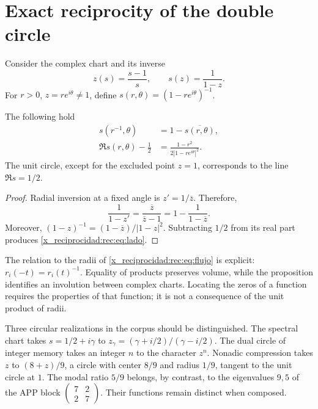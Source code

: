 \section{Exact reciprocity of the double circle}
\label{x_reciprocidad:rec:doble-circulo}

Consider the complex chart and its inverse
\[
 z(s)=\frac{s-1}{s},\qquad s(z)=\frac1{1-z}.
\]
For \(r>0\), \(z=re^{i\theta}\ne1\), define \(s(r,\theta)=(1-re^{i\theta})^{-1}\).

\begin{proposition}
\label{x_reciprocidad:rec:prop:espejo}
The following hold
\begin{align}
 s(r^{-1},\theta)&=1-\overline{s(r,\theta)},\label{x_reciprocidad:rec:eq:espejo}\\
 \Re s(r,\theta)-\frac12&=
 \frac{1-r^2}{2|1-re^{i\theta}|^2}.\label{x_reciprocidad:rec:eq:lado}
\end{align}
The unit circle, except for the excluded point \(z=1\), corresponds to the line \(\Re s=1/2\).
\end{proposition}
\begin{proof}
Radial inversion at a fixed angle is \(z'=1/\overline z\). Therefore,
\[
 \frac1{1-z'}=\frac{\overline z}{\overline z-1}
 =1-\frac1{1-\overline z}.
\]
Moreover, \((1-z)^{-1}=(1-\overline z)/|1-z|^2\). Subtracting \(1/2\) from its real part produces \eqref{x_reciprocidad:rec:eq:lado}.
\end{proof}

The relation to the radii of \eqref{x_reciprocidad:rec:eq:flujo} is explicit: \(r_i(-t)=r_i(t)^{-1}\). Equality of products preserves volume, while the proposition identifies an involution between complex charts. Locating the zeros of a function requires the properties of that function; it is not a consequence of the unit product of radii.

Three circular realizations in the corpus should be distinguished. The spectral chart takes \(s=1/2+i\gamma\) to \(z_\gamma=(\gamma+i/2)/(\gamma-i/2)\). The dual circle of integer memory takes an integer \(n\) to the character \(z^n\). Nonadic compression takes \(z\) to \((8+z)/9\), a circle with center \(8/9\) and radius \(1/9\), tangent to the unit circle at \(1\). The modal ratio \(5/9\) belongs, by contrast, to the eigenvalues \(9,5\) of the APP block \(\left(\begin{smallmatrix}7&2\\2&7\end{smallmatrix}\right)\). Their functions remain distinct when composed.

